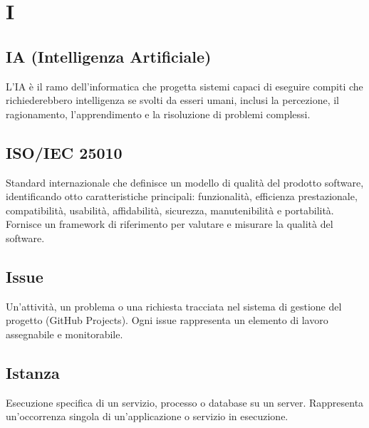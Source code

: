 \documentclass[a4paper, 11pt, oneside]{scrartcl} %
\begin{document}

\section*{I}


\subsection*{IA (Intelligenza Artificiale)}
L'IA è il ramo dell'informatica che progetta sistemi capaci di eseguire compiti che richiederebbero intelligenza se svolti da esseri umani, inclusi la percezione, il ragionamento, l'apprendimento e la risoluzione di problemi complessi.
\vspace{0.5cm}

\subsection*{ISO/IEC 25010}
Standard internazionale che definisce un modello di qualità del prodotto software, identificando otto caratteristiche principali: funzionalità, efficienza prestazionale, compatibilità, usabilità, affidabilità, sicurezza, manutenibilità e portabilità. Fornisce un framework di riferimento per valutare e misurare la qualità del software.
\vspace{0.5cm}

\subsection*{Issue}


Un'attività, un problema o una richiesta tracciata nel sistema di gestione del progetto (GitHub Projects). Ogni issue rappresenta un elemento di lavoro assegnabile e monitorabile.

\vspace{0.5cm}

\subsection*{Istanza}


Esecuzione specifica di un servizio, processo o database su un server. Rappresenta un'occorrenza singola di un'applicazione o servizio in esecuzione.
\end{document}
